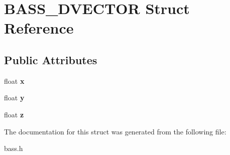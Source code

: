\hypertarget{structBASS__3DVECTOR}{}\section{B\+A\+S\+S\+\_\+D\+V\+E\+C\+T\+O\+R Struct Reference}
\label{structBASS__3DVECTOR}
\subsection*{Public Attributes}
\begin{DoxyCompactItemize}
\item 
\hypertarget{structBASS__3DVECTOR_af3d4cc65c06996e789da1c5c295039b1}{}float {\bfseries x}\label{structBASS__3DVECTOR_af3d4cc65c06996e789da1c5c295039b1}

\item 
\hypertarget{structBASS__3DVECTOR_a4284c81914926f579e3e1dde7ad06926}{}float {\bfseries y}\label{structBASS__3DVECTOR_a4284c81914926f579e3e1dde7ad06926}

\item 
\hypertarget{structBASS__3DVECTOR_a183f698058d7394590cba43e0735a110}{}float {\bfseries z}\label{structBASS__3DVECTOR_a183f698058d7394590cba43e0735a110}

\end{DoxyCompactItemize}


The documentation for this struct was generated from the following file\+:\begin{DoxyCompactItemize}
\item 
bass.\+h\end{DoxyCompactItemize}
